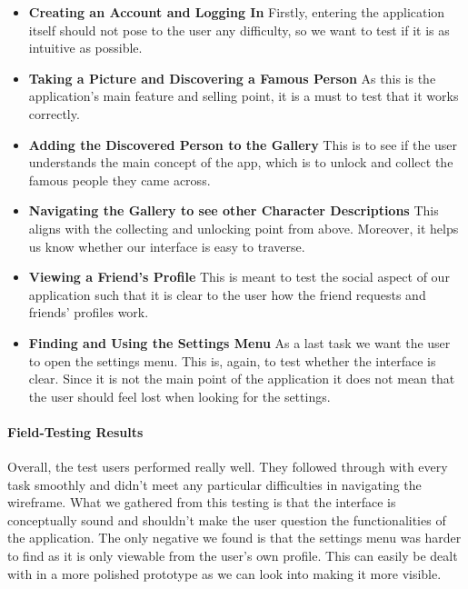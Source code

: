 \documentclass[12pt]{scrartcl}
\begin{document}
	\begin{itemize}
	\item  \textbf{Creating an Account and Logging In} Firstly, entering the application itself should
	not pose to the user any difficulty, so we want to test if it is as intuitive as possible.
	
	\item \textbf{Taking a Picture and Discovering a Famous Person} As this is the application's main
	feature and selling point, it is a must to test that it works correctly.
	
	\item \textbf{Adding the Discovered Person to the Gallery} This is to see if the user
	understands the main concept of the app, which is to unlock and collect the famous people
	they came across.
	
	\item \textbf{Navigating the Gallery to see other Character Descriptions} This aligns with the
	collecting and unlocking point from above. Moreover, it helps us know whether our interface is
	easy to traverse.
	
	\item \textbf{Viewing a Friend's Profile} This is meant to test the social aspect of our application
	such that it is clear to the user how the friend requests and friends' profiles work.
	
	\item \textbf{Finding and Using the Settings Menu} As a last task we want the user to open the
	settings menu. This is, again, to test whether the interface is clear. Since it is not the main point
	of the application it does not mean that the user should feel lost when looking for the settings.
	\end{itemize}
	
	\paragraph{\large Field-Testing Results}
	
	Overall, the test users performed really well. They followed through with every task smoothly and
	didn't meet any particular difficulties in navigating the wireframe. What we gathered from this
	testing is that the interface is conceptually sound and shouldn't make the user question the
	functionalities of the application. The only negative we found is that the settings menu was harder
	to find as it is only viewable from the user's own profile. This can easily be dealt with in a more
	polished prototype as we can look into making it more visible.
	
\end{document}
